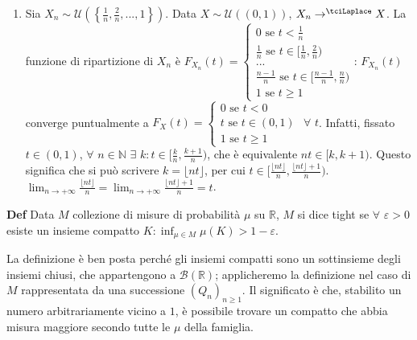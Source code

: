 \documentclass{article}
\begin{document}
\begin{enumerate}
\item Sia $X_{n}\sim \mathcal{U}\left( \left\{ \frac{1}{n},\frac{2}{n}%
,...,1\right\} \right) $. Data $X\sim \mathcal{U}\left( \left( 0,1\right)
\right) $, $X_{n}\rightarrow ^{\tciLaplace }X$. La funzione di ripartizione
di $X_{n}$ \`{e} $F_{X_{n}}\left( t\right) =\left\{ 
\begin{array}{c}
0\text{ se }t<\frac{1}{n} \\ 
\frac{1}{n}\text{ se }t\in \lbrack \frac{1}{n},\frac{2}{n}) \\ 
... \\ 
\frac{n-1}{n}\text{ se }t\in \lbrack \frac{n-1}{n},\frac{n}{n}) \\ 
1\text{ se }t\geq 1%
\end{array}%
\right. $: $F_{X_{n}}\left( t\right) $ converge puntualmente a $F_{X}\left(
t\right) =\left\{ 
\begin{array}{c}
0\text{ se }t<0 \\ 
t\text{ se }t\in \left( 0,1\right) \\ 
1\text{ se }t\geq 1%
\end{array}%
\right. $ $\forall $ $t$. Infatti, fissato $t\in \left( 0,1\right) $, $%
\forall $ $n\in 
\mathbb{N}
$ $\exists $ $k:t\in \lbrack \frac{k}{n},\frac{k+1}{n})$, che \`{e}
equivalente $nt\in \lbrack k,k+1)$. Questo significa che si pu\`{o} scrivere 
$k=\lfloor nt\rfloor $, per cui $t\in \lbrack \frac{\lfloor nt\rfloor }{n},%
\frac{\lfloor nt\rfloor +1}{n})$. $\lim_{n\rightarrow +\infty }\frac{\lfloor
nt\rfloor }{n}=\lim_{n\rightarrow +\infty }\frac{\lfloor nt\rfloor +1}{n}=t$.
\end{enumerate}

\textbf{Def} Data $M$ collezione di misure di probabilit\`{a} $\mu $ su $%
\mathbb{R}
$, $M$ si dice tight se $\forall $ $\varepsilon >0$ esiste un insieme
compatto $K:\inf_{\mu \in M}\mu \left( K\right) >1-\varepsilon $.

La definizione \`{e} ben posta perch\'{e} gli insiemi compatti sono un
sottinsieme degli insiemi chiusi, che appartengono a $\mathcal{B}\left( 
\mathbb{R}
\right) $; applicheremo la definizione nel caso di $M$ rappresentata da una
successione $\left( Q_{n}\right) _{n\geq 1}$. Il significato \`{e} che,
stabilito un numero arbitrariamente vicino a $1$, \`{e} possibile trovare un
compatto che abbia misura maggiore secondo tutte le $\mu $ della famiglia.
\end{document}
